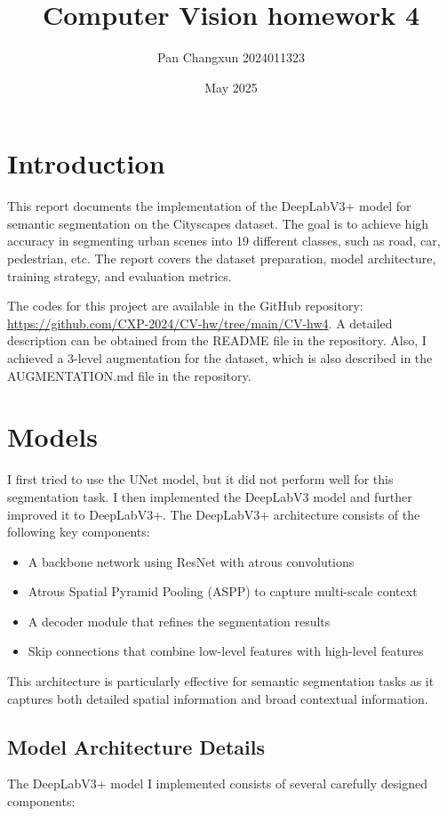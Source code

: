\documentclass[]{article}
\title{\textbf{Computer Vision homework 4}}
\author{Pan Changxun 2024011323}
\date{May 2025}
\begin{document}
\maketitle

\section{Introduction}
This report documents the implementation of the DeepLabV3+ model for semantic segmentation on the Cityscapes dataset. The goal is to achieve high accuracy in segmenting urban scenes into 19 different classes, such as road, car, pedestrian, etc. The report covers the dataset preparation, model architecture, training strategy, and evaluation metrics.

The codes for this project are available in the GitHub repository: \url{https://github.com/CXP-2024/CV-hw/tree/main/CV-hw4}.
A detailed description can be obtained from the README file in the repository. Also, I achieved a 3-level augmentation for the dataset, which is also described in the AUGMENTATION.md file in the repository.
\section{Models}
I first tried to use the UNet model, but it did not perform well for this segmentation task. I then implemented the DeepLabV3 model and further improved it to DeepLabV3+. The DeepLabV3+ architecture consists of the following key components:

\begin{itemize}
    \item A backbone network using ResNet with atrous convolutions
    \item Atrous Spatial Pyramid Pooling (ASPP) to capture multi-scale context
    \item A decoder module that refines the segmentation results
    \item Skip connections that combine low-level features with high-level features
\end{itemize}

This architecture is particularly effective for semantic segmentation tasks as it captures both detailed spatial information and broad contextual information.

\subsection{Model Architecture Details}
The DeepLabV3+ model I implemented consists of several carefully designed components:
\end{document}
